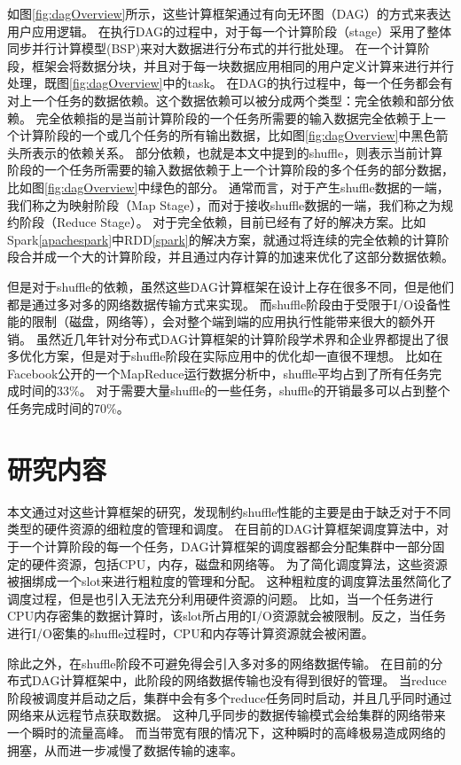 如图\ref{fig:dagOverview}所示，这些计算框架通过有向无环图（DAG）的方式来表达用户应用逻辑。
在执行DAG的过程中，对于每一个计算阶段（stage）采用了整体同步并行计算模型(BSP)来对大数据进行分布式的并行批处理。
在一个计算阶段，框架会将数据分块，并且对于每一块数据应用相同的用户定义计算来进行并行处理，既图\ref{fig:dagOverview}中的task。
在DAG的执行过程中，每一个任务都会有对上一个任务的数据依赖。这个数据依赖可以被分成两个类型：完全依赖和部分依赖。
完全依赖指的是当前计算阶段的一个任务所需要的输入数据完全依赖于上一个计算阶段的一个或几个任务的所有输出数据，比如图\ref{fig:dagOverview}中黑色箭头所表示的依赖关系。
部分依赖，也就是本文中提到的shuffle，则表示当前计算阶段的一个任务所需要的输入数据依赖于上一个计算阶段的多个任务的部分数据，比如图\ref{fig:dagOverview}中绿色的部分。
通常而言，对于产生shuffle数据的一端，我们称之为映射阶段（Map Stage），而对于接收shuffle数据的一端，我们称之为规约阶段（Reduce Stage）。
对于完全依赖，目前已经有了好的解决方案。比如Spark\ref{apachespark}中RDD\ref{spark}的解决方案，就通过将连续的完全依赖的计算阶段合并成一个大的计算阶段，并且通过内存计算的加速来优化了这部分数据依赖。

但是对于shuffle的依赖，虽然这些DAG计算框架在设计上存在很多不同，但是他们都是通过多对多的网络数据传输方式来实现。
而shuffle阶段由于受限于I/O设备性能的限制（磁盘，网络等），会对整个端到端的应用执行性能带来很大的额外开销。
虽然近几年针对分布式DAG计算框架的计算阶段学术界和企业界都提出了很多优化方案\cite{pacman, babu, quincy, sync}，但是对于shuffle阶段在实际应用中的优化却一直很不理想。
比如在Facebook公开的一个MapReduce运行数据分析中，shuffle平均占到了所有任务完成时间的33\%。
对于需要大量shuffle的一些任务，shuffle的开销最多可以占到整个任务完成时间的70\%\cite{managing}。

\section{研究内容}

本文通过对这些计算框架的研究，发现制约shuffle性能的主要是由于缺乏对于不同类型的硬件资源的细粒度的管理和调度。
在目前的DAG计算框架调度算法中，对于一个计算阶段的每一个任务，DAG计算框架的调度器都会分配集群中一部分固定的硬件资源，包括CPU，内存，磁盘和网络等。
为了简化调度算法，这些资源被捆绑成一个slot来进行粗粒度的管理和分配。
这种粗粒度的调度算法虽然简化了调度过程，但是也引入无法充分利用硬件资源的问题。
比如，当一个任务进行CPU内存密集的数据计算时，该slot所占用的I/O资源就会被限制。反之，当任务进行I/O密集的shuffle过程时，CPU和内存等计算资源就会被闲置。

除此之外，在shuffle阶段不可避免得会引入多对多的网络数据传输。
在目前的分布式DAG计算框架中，此阶段的网络数据传输也没有得到很好的管理。
当reduce阶段被调度并启动之后，集群中会有多个reduce任务同时启动，并且几乎同时通过网络来从远程节点获取数据。
这种几乎同步的数据传输模式会给集群的网络带来一个瞬时的流量高峰。
而当带宽有限的情况下，这种瞬时的高峰极易造成网络的拥塞，从而进一步减慢了数据传输的速率。

